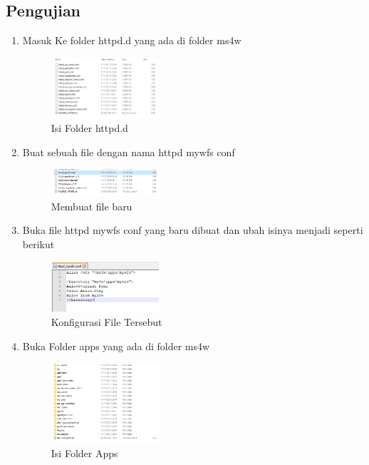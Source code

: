 \subsection{Pengujian}
\begin{enumerate}
  \item Masuk Ke folder httpd.d yang ada di folder ms4w
  \hfill\break
    \begin{figure}[H]
		\includegraphics[width=4cm]{figures/Tugas4/1174077/11.png}
		\centering
		\caption{Isi Folder httpd.d}
    \end{figure}
  \item Buat sebuah file dengan nama httpd mywfs conf
  \hfill\break
    \begin{figure}[H]
		\includegraphics[width=4cm]{figures/Tugas4/1174077/12.png}
		\centering
		\caption{Membuat file baru}
    \end{figure}
  \item Buka file httpd mywfs conf yang baru dibuat dan ubah isinya menjadi seperti berikut
  \hfill\break
    \begin{figure}[H]
		\includegraphics[width=4cm]{figures/Tugas4/1174077/13.png}
		\centering
		\caption{Konfigurasi File Tersebut}
    \end{figure}
  \item Buka Folder apps yang ada di folder ms4w
  \hfill\break
    \begin{figure}[H]
		\includegraphics[width=4cm]{figures/Tugas4/1174077/14.png}
		\centering
		\caption{Isi Folder Apps}
    \end{figure}

\end{enumerate}
